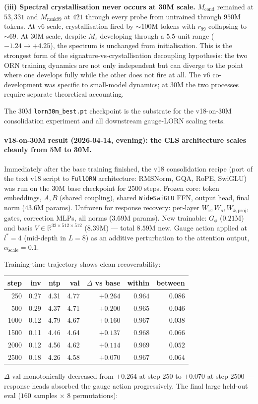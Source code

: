 \documentclass[11pt, a4paper]{article}
\newcommand{\R}{\mathbb{R}}
\theoremstyle{plain}
\theoremstyle{definition}
\theoremstyle{remark}
\begin{document}
\textbf{(iii) Spectral crystallisation never occurs at 30M scale.}
$M_{\mathrm{cond}}$ remained at $53{,}331$ and $M_{\mathrm{rank99}}$ at $421$ through every probe from untrained through $950$M tokens. At v6 scale, crystallisation fired by $\sim 100$M tokens with $r_{99}$ collapsing to $\sim 69$. At 30M scale, despite $M_z$ developing through a $5.5$-unit range ($-1.24 \to +4.25$), the spectrum is unchanged from initialisation. This is the strongest form of the signature-vs-crystallisation decoupling hypothesis: the two ORN training dynamics are not only independent but can diverge to the point where one develops fully while the other does not fire at all. The v6 co-development was specific to small-model dynamics; at 30M the two processes require separate theoretical accounting.

The 30M \texttt{lorn30m\_best.pt} checkpoint is the substrate for the v18-on-30M consolidation experiment and all downstream gauge-LORN scaling tests.

\paragraph{v18-on-30M result (2026-04-14, evening): the CLS architecture scales cleanly from 5M to 30M.}
Immediately after the base training finished, the v18 consolidation recipe (port of the text v18 script to \texttt{FullORN} architecture: RMSNorm, GQA, RoPE, SwiGLU) was run on the 30M base checkpoint for $2500$ steps.
Frozen core: token embeddings, $A, B$ (shared coupling), shared \texttt{WideSwiGLU} FFN, output head, final norm ($43.6$M params).
Unfrozen for response recovery: per-layer $W_v, W_o, W_{k,\mathrm{proj}}$, gates, correction MLPs, all norms ($3.69$M params).
New trainable: $G_\phi$ ($0.21$M) and basis $V \in \R^{32 \times 512 \times 512}$ ($8.39$M) — total $8.59$M new.
Gauge action applied at $l^{*} = 4$ (mid-depth in $L{=}8$) as an additive perturbation to the attention output, $\alpha_{\mathrm{scale}} = 0.1$.

Training-time trajectory shows clean recoverability:
\begin{center}
\small
\begin{tabular}{rrrrrrr}
\toprule
step & inv & ntp & val & $\Delta$ vs base & within & between \\
\midrule
  250 & 0.27 & 4.31 & 4.77 & $+0.264$ & $0.964$ & $0.086$ \\
  500 & 0.29 & 4.37 & 4.71 & $+0.200$ & $0.965$ & $0.046$ \\
 1000 & 0.12 & 4.79 & 4.67 & $+0.160$ & $0.967$ & $0.038$ \\
 1500 & 0.11 & 4.46 & 4.64 & $+0.137$ & $0.968$ & $0.066$ \\
 2000 & 0.12 & 4.56 & 4.62 & $+0.114$ & $0.969$ & $0.052$ \\
 2500 & 0.18 & 4.26 & 4.58 & $+0.070$ & $0.967$ & $0.064$ \\
\bottomrule
\end{tabular}
\end{center}
$\Delta$ val monotonically decreased from $+0.264$ at step $250$ to $+0.070$ at step $2500$ — response heads absorbed the gauge action progressively. The final large held-out eval ($160$ samples $\times$ $8$ permutations):
\end{document}

